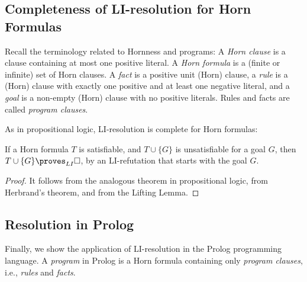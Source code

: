 \subsection{Completeness of LI-resolution for Horn Formulas}

Recall the terminology related to Hornness and programs: A \emph{Horn clause} is a clause containing at most one positive literal. A \emph{Horn formula} is a (finite or infinite) set of Horn clauses.
A \emph{fact} is a positive unit (Horn) clause, a \emph{rule} is a (Horn) clause with exactly one positive and at least one negative literal, and a \emph{goal} is a non-empty (Horn) clause with no positive literals. Rules and facts are called \emph{program clauses}.

As in propositional logic, LI-resolution is complete for Horn formulas:

\begin{theorem}\label{theorem:completeness-of-li-resolution-for-horn-predicate}
If a Horn formula $T$ is satisfiable, and $T\cup\{G\}$ is unsatisfiable for a goal $G$, then $T\cup\{G\}\proves_{LI}\square$, by an LI-refutation that starts with the goal $G$.   
\end{theorem}
\begin{proof}
    It follows from the analogous theorem in propositional logic, from Herbrand's theorem, and from the Lifting Lemma.
\end{proof}


\subsection{Resolution in Prolog}\label{subsection:resolution-in-prolog}

Finally, we show the application of LI-resolution in the Prolog programming language. A \emph{program} in Prolog is a Horn formula containing only \emph{program clauses}, i.e., \emph{rules} and \emph{facts}.

